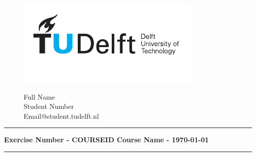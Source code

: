 \documentclass[a4paper, answers, addpoints]{exam}
\begin{document}
\begin{figure}[ht!]
    \begin{minipage}[H]{0.33\textwidth}
		\vspace{0.3cm}
		\includegraphics[scale=0.8]{TUDelftLogo.pdf}
	\end{minipage}
	\begin{minipage}[H]{0.33\textwidth}
    \hfill
	\end{minipage}
	\begin{minipage}[H]{0.33\textwidth}
		\begin{center}
		\large{Full Name}\\
		\normalsize
			Student Number\\
			Email@student.tudelft.nl
		\end{center}
	\end{minipage}
\end{figure}
\vspace{-0.5cm}
\hrule
\begin{center}
	\textbf{Exercise Number - COURSEID Course Name  - \today}\\
\end{center}
\hrule
\vspace{0.3cm}
    
\end{document}
